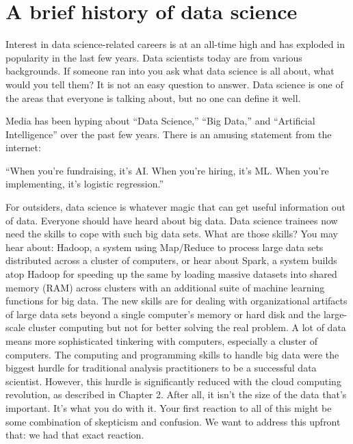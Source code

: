 \documentclass[12pt,]{krantz}
\renewenvironment{quote}{\begin{VF}}{\end{VF}}
\begin{document}
\hypertarget{a-brief-history-of-data-science}{%
\section{A brief history of data science}\label{a-brief-history-of-data-science}}

Interest in data science-related careers is at an all-time high and has exploded in popularity in the last few years. Data scientists today are from various backgrounds. If someone ran into you ask what data science is all about, what would you tell them? It is not an easy question to answer. Data science is one of the areas that everyone is talking about, but no one can define it well.

Media has been hyping about ``Data Science,'' ``Big Data,'' and ``Artificial Intelligence'' over the past few years. There is an amusing statement from the internet:

\begin{quote}
``When you're fundraising, it's AI. When you're hiring, it's ML. When you're implementing, it's logistic regression.''
\end{quote}

For outsiders, data science is whatever magic that can get useful information out of data. Everyone should have heard about big data. Data science trainees now need the skills to cope with such big data sets. What are those skills? You may hear about: Hadoop, a system using Map/Reduce to process large data sets distributed across a cluster of computers, or hear about Spark, a system builds atop Hadoop for speeding up the same by loading massive datasets into shared memory (RAM) across clusters with an additional suite of machine learning functions for big data. The new skills are for dealing with organizational artifacts of large data sets beyond a single computer's memory or hard disk and the large-scale cluster computing but not for better solving the real problem. A lot of data means more sophisticated tinkering with computers, especially a cluster of computers. The computing and programming skills to handle big data were the biggest hurdle for traditional analysis practitioners to be a successful data scientist. However, this hurdle is significantly reduced with the cloud computing revolution, as described in Chapter 2. After all, it isn't the size of the data that's important. It's what you do with it. Your first reaction to all of this might be some combination of skepticism and confusion. We want to address this upfront that: we had that exact reaction.
\end{document}
